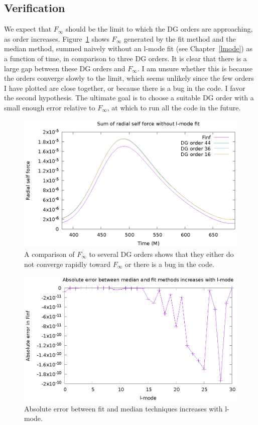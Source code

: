 \subsection{Verification}

We expect that $F_\infty$ should be the limit to which the DG orders are approaching, as order increases. Figure~\ref{limit} shows $F_\infty$ generated by the fit method and the median method, summed naively without an l-mode fit (see Chapter~\ref{lmode}) as a function of time, in comparison to three DG orders. It is clear that there is a large gap between these DG orders and $F_\infty$. I am unsure whether this is because the orders converge slowly to the limit, which seems unlikely since the few orders I have plotted are close together, or because there is a bug in the code. I favor the second hypothesis. The ultimate goal is to choose a suitable DG order with a small enough error relative to $F_\infty$, at which to run all the code in the future.

\begin{figure}
\includegraphics{unextrapsumcompareDG}
\caption{A comparison of $F_\infty$ to several DG orders shows that they either do not converge rapidly toward $F_\infty$ or there is a bug in the code.}
\label{limit}
\end{figure}


\begin{figure}
  \includegraphics{absErrorIncreaseslmode}
  \caption{Absolute error between fit and median techniques increases with l-mode.}
\end{figure}




